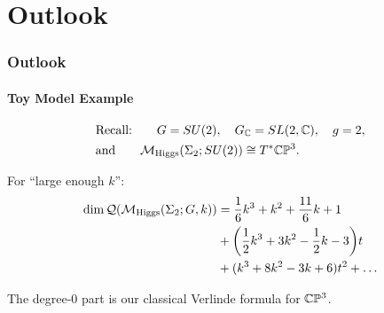 \section[]{Outlook}

\begin{frame}
	\frametitle{Outlook}
	\framesubtitle{Toy Model Example}
	\begin{equation*}
		\begin{split}
					&\text{Recall:}\qquad G=SU(2),\quad G_{\mathbb{C}} = SL(2,\mathbb{C}),\quad g=2, \\
					&\text{and}\qquad\mathcal{M}_{\text{Higgs}}(\Sigma_{2};SU(2)) \cong T^{\ast}\mathbb{C}\mathbb{P}^{3}.
		\end{split}
	\end{equation*}

	\begin{ex}
		For ``large enough $k$'':
		\begin{equation*}
		\begin{split}
			\dim \mathcal{Q}(\mathcal{M}_{\text{Higgs}}(\Sigma_{2};G,k)) &= \frac{1}{6}k^{3} + k^{2} + \frac{11}{6}k + 1 \\
			&+ \bigg( \frac{1}{2}k^{3} + 3k^{2} - \frac{1}{2}k - 3  \bigg)t \\
			&+ (k^{3} + 8k^{2} -3k + 6) t^{2} + \ldots
		\end{split}
		\end{equation*}
	\end{ex}
	
	The degree-0 part is our classical Verlinde formula for $\mathbb{C}\mathbb{P}^{3}$.
	
\end{frame}

